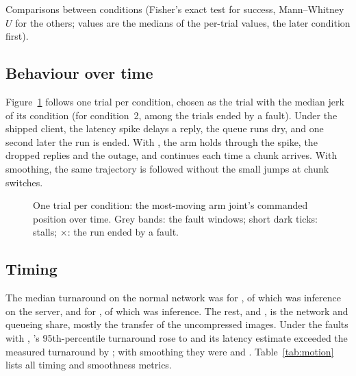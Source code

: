 \begin{table}[htbp]
  \centering
  \caption{Comparisons between conditions (Fisher's exact test for success, Mann--Whitney $U$ for the others; values
           are the medians of the per-trial values, the later condition first).}
  \label{tab:tests}
  \small
  \begin{adjustbox}{max width=\textwidth}
  \end{adjustbox}
\end{table}

\subsection{Behaviour over time}

Figure~\ref{fig:timeline} follows one \smolvla{} trial per condition, chosen as the trial with the median jerk of its
condition (for condition~2, among the trials ended by a fault). Under the shipped client, the latency spike delays a
reply, the queue runs dry, and one second later the run is ended. With \drtc, the arm holds through the spike, the
dropped replies and the outage, and continues each time a chunk arrives. With smoothing, the same trajectory is
followed without the small jumps at chunk switches.

\begin{figure}[htbp]
  \centering
  \caption{One \smolvla{} trial per condition: the most-moving arm joint's commanded position over time. Grey bands:
           the fault windows; short dark ticks: stalls; $\times$: the run ended by a fault.}
  \label{fig:timeline}
\end{figure}

\subsection{Timing}

The median turnaround on the normal network was  for \smolvla{}, of which
 was inference on the server, and  for \groot{}, of which
 was inference. The rest,  and ,
is the network and queueing share, mostly the transfer of the uncompressed images. Under the faults with \drtc{},
\groot's 95th-percentile turnaround rose to  and its latency estimate exceeded the measured
turnaround by ; with smoothing they were  and
. Table~\ref{tab:motion} lists all timing and smoothness metrics.

